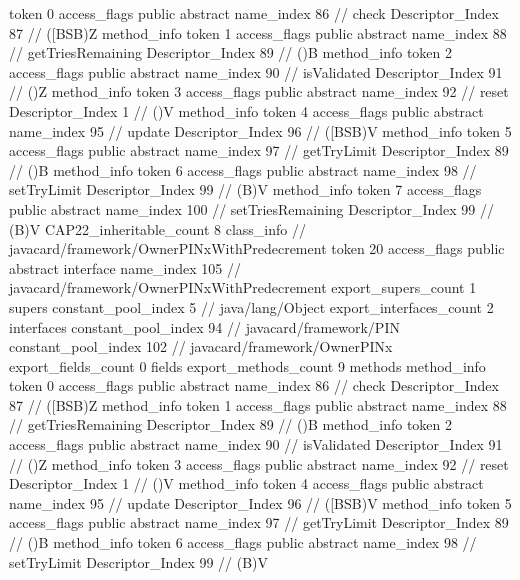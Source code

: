 {{{{{					token	0
					access_flags	public abstract
					name_index	86		// check
					Descriptor_Index	87		// ([BSB)Z
				}
				method_info {
					token	1
					access_flags	public abstract
					name_index	88		// getTriesRemaining
					Descriptor_Index	89		// ()B
				}
				method_info {
					token	2
					access_flags	public abstract
					name_index	90		// isValidated
					Descriptor_Index	91		// ()Z
				}
				method_info {
					token	3
					access_flags	public abstract
					name_index	92		// reset
					Descriptor_Index	1		// ()V
				}
				method_info {
					token	4
					access_flags	public abstract
					name_index	95		// update
					Descriptor_Index	96		// ([BSB)V
				}
				method_info {
					token	5
					access_flags	public abstract
					name_index	97		// getTryLimit
					Descriptor_Index	89		// ()B
				}
				method_info {
					token	6
					access_flags	public abstract
					name_index	98		// setTryLimit
					Descriptor_Index	99		// (B)V
				}
				method_info {
					token	7
					access_flags	public abstract
					name_index	100		// setTriesRemaining
					Descriptor_Index	99		// (B)V
				}
			}
			CAP22_inheritable_count	8
		}
		class_info {		// javacard/framework/OwnerPINxWithPredecrement
			token	20
			access_flags	public abstract interface
			name_index	105		// javacard/framework/OwnerPINxWithPredecrement
			export_supers_count	1
			supers {
				constant_pool_index	5		// java/lang/Object
			}
			export_interfaces_count	2
			interfaces {
				constant_pool_index	94		// javacard/framework/PIN
				constant_pool_index	102		// javacard/framework/OwnerPINx
			}
			export_fields_count	0
			fields {
			}
			export_methods_count	9
			methods {
				method_info {
					token	0
					access_flags	public abstract
					name_index	86		// check
					Descriptor_Index	87		// ([BSB)Z
				}
				method_info {
					token	1
					access_flags	public abstract
					name_index	88		// getTriesRemaining
					Descriptor_Index	89		// ()B
				}
				method_info {
					token	2
					access_flags	public abstract
					name_index	90		// isValidated
					Descriptor_Index	91		// ()Z
				}
				method_info {
					token	3
					access_flags	public abstract
					name_index	92		// reset
					Descriptor_Index	1		// ()V
				}
				method_info {
					token	4
					access_flags	public abstract
					name_index	95		// update
					Descriptor_Index	96		// ([BSB)V
				}
				method_info {
					token	5
					access_flags	public abstract
					name_index	97		// getTryLimit
					Descriptor_Index	89		// ()B
				}
				method_info {
					token	6
					access_flags	public abstract
					name_index	98		// setTryLimit
					Descriptor_Index	99		// (B)V
}}}}}
